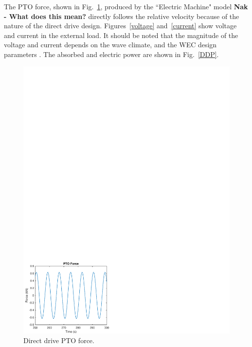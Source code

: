 \documentclass[twocolumn,10pt]{asme2e}
\begin{document}
The PTO force, shown in Fig.~\ref{DD_Fpto}, produced by the ``Electric Machine" model \textbf{Nak - What does this mean?} directly follows the relative velocity because of the nature of the direct drive design. Figures~\ref{voltage} and~\ref{current} show voltage and current in the external load. It should be noted that the magnitude of the voltage and current depends on the wave climate, and the WEC design parameters \cite{prudell2009novel}.  The absorbed and electric power are shown in Fig.~\ref{DDP}. 

\begin{figure}[t]
    \centering
    \includegraphics[width=1\columnwidth]{Images/DDFpto}
    \caption{Direct drive PTO force.}
    \label{DD_Fpto}
    \end{figure}
\end{document}
